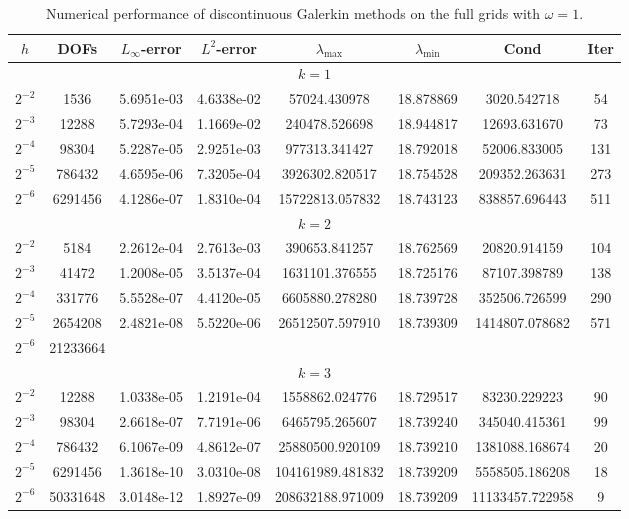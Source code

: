 \documentclass[final,leqno]{siamltex704}
\begin{document}
\begin{table}
\caption{Numerical performance of discontinuous Galerkin methods on the full grids with $\omega=1.$}
\begin{tabular}{cccccccc}\hline\hline
$h$ & DOFs & $L_{\infty}$-error & $L^2$-error & $\lambda_{\max}$ & $\lambda_{\min}$ & Cond & Iter \\ \hline
\multicolumn{8}{c}{$k=1$}\\ \hline
$2^{-2}$   &1536   &5.6951e-03   &4.6338e-02 &57024.430978    &18.878869 &3020.542718   &54\\
$2^{-3}$   &12288 &5.7293e-04   &1.1669e-02 &240478.526698   &18.944817 &12693.631670  &73\\
$2^{-4}$   &98304 &5.2287e-05   &2.9251e-03 &977313.341427   &18.792018 &52006.833005  &131\\
$2^{-5}$   &786432 &4.6595e-06   &7.3205e-04 &3926302.820517  &18.754528 &209352.263631 &273\\
$2^{-6}$   &6291456 &4.1286e-07   &1.8310e-04 &15722813.057832 &18.743123 &838857.696443 &511\\ \hline
\multicolumn{8}{c}{$k=2$}\\ \hline
$2^{-2}$   &5184 &2.2612e-04   &2.7613e-03 &390653.841257   &18.762569  &20820.914159   &104 \\
$2^{-3}$   &41472 &1.2008e-05   &3.5137e-04 &1631101.376555  &18.725176  &87107.398789   &138\\
$2^{-4}$   &331776 &5.5528e-07   &4.4120e-05 &6605880.278280  &18.739728  &352506.726599  &290\\
$2^{-5}$   &2654208 &2.4821e-08   &5.5220e-06 &26512507.597910 &18.739309  &1414807.078682 &571\\
$2^{-6}$   &21233664\\ \hline
\multicolumn{8}{c}{$k=3$}\\ \hline
$2^{-2}$ &12288       &1.0338e-05   &1.2191e-04 &1558862.024776     &18.729517 &83230.229223     &90\\
$2^{-3}$ &98304       &2.6618e-07   &7.7191e-06 &6465795.265607     &18.739240 &345040.415361   &99\\
$2^{-4}$ &786432     &6.1067e-09   &4.8612e-07 &25880500.920109   &18.739210 &1381088.168674 &20\\
$2^{-5}$ &6291456   &1.3618e-10   &3.0310e-08 &104161989.481832 &18.739209 &5558505.186208 &18\\
$2^{-6}$ &50331648 &3.0148e-12   &1.8927e-09 &208632188.971009 &18.739209 &11133457.722958 &9\\ \hline\hline
\end{tabular}
\end{table}
\end{document}
